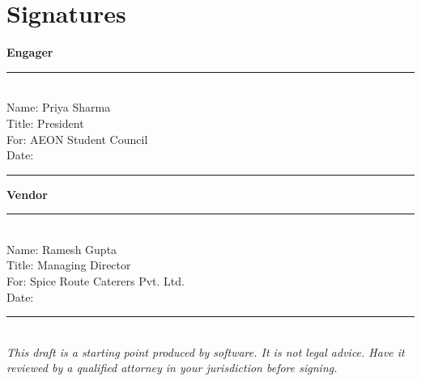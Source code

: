 \documentclass[11pt,letterpaper]{article}
\begin{document}
\section*{Signatures}
\vspace{2em}
\noindent\begin{minipage}[t]{0.45\textwidth}
\textbf{Engager}\\[2em]
\rule{\linewidth}{0.4pt}\\
Name: Priya Sharma\\
Title: President\\
For: AEON Student Council\\
Date: \rule{6em}{0.4pt}
\end{minipage}\hfill
\noindent\begin{minipage}[t]{0.45\textwidth}
\textbf{Vendor}\\[2em]
\rule{\linewidth}{0.4pt}\\
Name: Ramesh Gupta\\
Title: Managing Director\\
For: Spice Route Caterers Pvt. Ltd.\\
Date: \rule{6em}{0.4pt}
\end{minipage}

\vfill
\noindent\hrulefill\\[0.4em]
{\footnotesize\textit{This draft is a starting point produced by software. It is not legal advice. Have it reviewed by a qualified attorney in your jurisdiction before signing.}}
\end{document}
